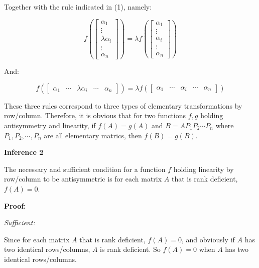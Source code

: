 \documentclass{article}
\begin{document}
Together with the rule indicated in (1), namely:

\begin{equation}
f(\begin{bmatrix}
    \alpha_1 \\
    \vdots \\
    \lambda\alpha_i \\
    \vdots \\
    \alpha_n
\end{bmatrix})=
\lambda f(\begin{bmatrix}
    \alpha_1 \\
    \vdots \\
    \alpha_i \\
    \vdots \\
    \alpha_n
\end{bmatrix})
\end{equation}

And:

\begin{equation}
f(\begin{bmatrix}
    \alpha_1 &
    \cdots &
    \lambda\alpha_i &
    \cdots &
    \alpha_n
\end{bmatrix})=
\lambda f(\begin{bmatrix}
    \alpha_1 &
    \cdots &
    \alpha_i &
    \cdots &
    \alpha_n
\end{bmatrix})
\end{equation}

These three rules correspond to three types of elementary transformations
by row/column. Therefore, it is obvious that for two functions \(f,g\) holding
antisymmetry and linearity, if \(f(A)=g(A)\) and \(B=AP_1P_2\cdots P_n\)
where \(P_1, P_2, \cdots, P_n\) are all elementary matrics, then
\(f(B)=g(B)\).

\vspace{2mm}
\textbf{Inference 2}

The necessary and sufficient condition for a function \(f\) holding
linearity by row/column to be antisymmetric is for each matrix
\(A\) that is rank deficient, \(f(A)=0\).

\vspace{2mm}
\textbf{Proof:}

\vspace{1mm}
\textit{Sufficient:}

Since for each matrix \(A\) that is rank deficient, \(f(A)=0\),
and obviously if \(A\) has two identical rows/columns, \(A\) is
rank deficient. So \(f(A)=0\) when \(A\) has two identical rows/columns.
\end{document}
